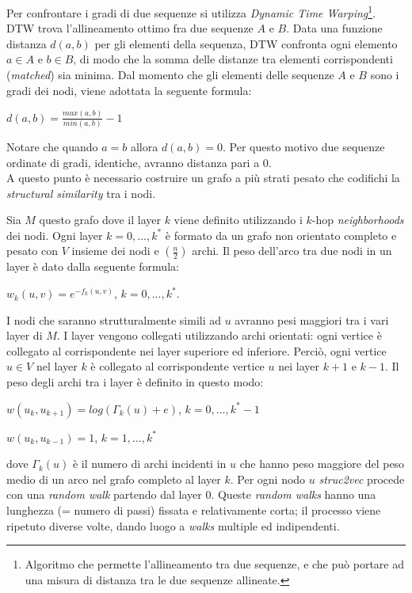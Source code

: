 \documentclass[11pt]{article}
\begin{document}
Per confrontare i gradi di due sequenze si utilizza \textit{Dynamic Time Warping}\footnote{Algoritmo che permette l'allineamento tra due sequenze, e che può portare ad una misura di distanza tra le due sequenze allineate.}. DTW trova l'allineamento ottimo fra due sequenze $A$ e $B$. Data una funzione distanza $d(a,b)$ per gli elementi della sequenza, DTW confronta ogni elemento $a \in A$ e $b \in B$, di modo che la somma delle distanze tra elementi corrispondenti (\textit{matched}) sia minima. Dal momento che gli elementi delle sequenze $A$ e $B$ sono i gradi dei nodi, viene adottata la seguente formula:
\begin{center}
$d(a,b) = \displaystyle{\frac{max(a,b)}{min(a,b)}}-1$
\end{center}

Notare che quando $a = b$ allora $d(a,b) = 0$. Per questo motivo due sequenze ordinate di gradi, identiche, avranno distanza pari a 0.\\

A questo punto è necessario costruire un grafo a più strati pesato che codifichi la \textit{structural similarity} tra i nodi. 

Sia $M$ questo grafo dove il layer $k$ viene definito utilizzando i $k$-hop \textit{neighborhoods} dei nodi. Ogni layer $k = 0,...,k^*$ è formato da un grafo non orientato completo e pesato con $V$ insieme dei nodi e $\displaystyle{\left(\frac{n}{2}\right)}$ archi. Il peso dell'arco tra due nodi in un layer è dato dalla seguente formula:
\begin{center}
$w_k(u,v) = e^{-f_k(u,v)}$, $k = 0,...,k^*$.
\end{center}
I nodi che saranno strutturalmente simili ad $u$ avranno pesi maggiori tra i vari layer di $M$. I layer vengono collegati utilizzando archi orientati: ogni vertice è collegato al corrispondente nei layer superiore ed inferiore. Perciò, ogni vertice $u \in V$ nel layer $k$ è collegato al corrispondente vertice $u$ nei layer $k+1$ e $k-1$. Il peso degli archi tra i layer è definito in questo modo:
\begin{center}
$w(u_k,u_{k+1}) = log(\Gamma_k(u) + e)$, $k = 0,...,k^*-1$
\end{center}
\begin{center}
$w(u_k,u_{k-1}) = 1$, $k = 1,...,k^*$
\end{center}
dove $\Gamma_k(u)$ è il numero di archi incidenti in $u$ che hanno peso maggiore del peso medio di un arco nel grafo completo al layer $k$. 
Per ogni nodo $u$ \textit{struc2vec} procede con una \textit{random walk} partendo dal layer 0. Queste \textit{random walks} hanno una lunghezza (= numero di passi) fissata e relativamente corta; il processo viene ripetuto diverse volte, dando luogo a \textit{walks} multiple ed indipendenti.
\end{document}
